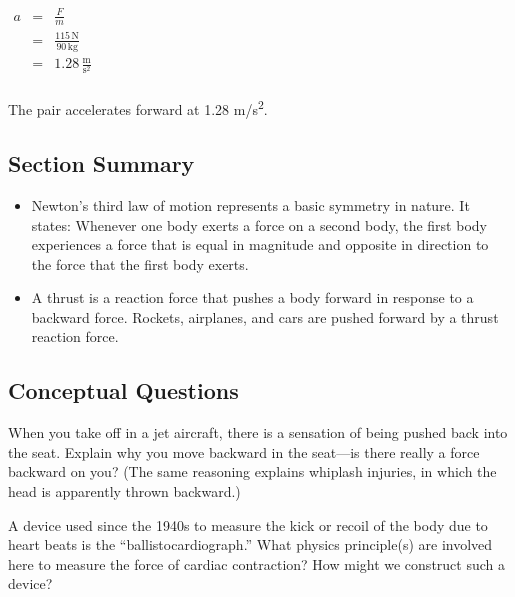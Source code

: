 \documentclass[
]{book}
\providecommand{\tightlist}{%
  \setlength{\itemsep}{0pt}\setlength{\parskip}{0pt}}
\begin{document}
\(\begin{matrix} a & = & \frac{F}{m} \\  & = & \frac{115\,\text{N}}{90\,\text{kg}} \\  & = & {1.28\,\frac{\text{m}}{\text{s}^{2}}} \\ \end{matrix}\)

The pair accelerates forward at 1.28 m/s\textsuperscript{2}.

\hypertarget{fs-id1446741-summary}{}
\hypertarget{section-summary-11}{%
\subsection{Section Summary}\label{section-summary-11}}

\begin{itemize}
\tightlist
\item
  {Newton's third law of motion} represents a basic
  symmetry in nature. It states: Whenever one body exerts a force on a
  second body, the first body experiences a force that is equal in
  magnitude and opposite in direction to the force that the first body
  exerts.
\item
  A {thrust} is a reaction force that pushes a body
  forward in response to a backward force. Rockets, airplanes, and
  cars are pushed forward by a thrust reaction force.
\end{itemize}

\hypertarget{fs-id1460367}{}
\hypertarget{conceptual-questions-14}{%
\subsection{Conceptual Questions}\label{conceptual-questions-14}}

\hypertarget{fs-id1572333}{}
\leavevmode{}%
When you take off in a jet aircraft, there is a sensation of being
pushed back into the seat. Explain why you move backward in the
seat---is there really a force backward on you? (The same reasoning
explains whiplash injuries, in which the head is apparently thrown
backward.)

\hypertarget{fs-id1595226}{}
\leavevmode{}%
A device used since the 1940s to measure the kick or recoil of the body
due to heart beats is the ``ballistocardiograph.'' What physics
principle(s) are involved here to measure the force of cardiac
contraction? How might we construct such a device?
\end{document}
